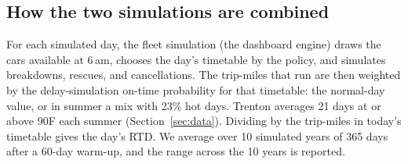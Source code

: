 \documentclass[11pt]{article}
\begin{document}
\subsection{How the two simulations are combined}
For each simulated day, the fleet simulation (the dashboard engine) draws the cars available at 6\,am, chooses the day's timetable by the policy, and simulates breakdowns, rescues, and cancellations. The trip-miles that run are then weighted by the delay-simulation on-time probability for that timetable: the normal-day value, or in summer a mix with 23\% hot days. Trenton averages 21 days at or above 90\textdegree F each summer (Section~\ref{sec:data}). Dividing by the trip-miles in today's timetable gives the day's RTD. We average over 10 simulated years of 365 days after a 60-day warm-up, and the range across the 10 years is reported.
\end{document}
